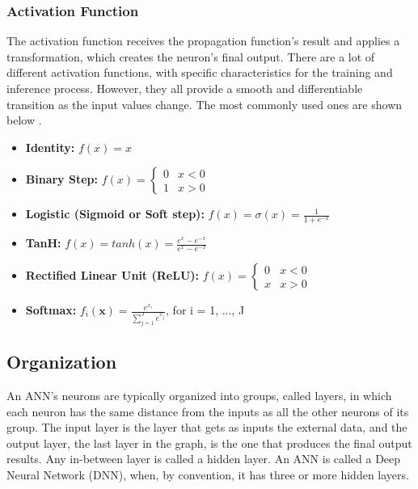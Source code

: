 \subsubsection{Activation Function}
The activation function receives the propagation function's result and applies a transformation, which creates the neuron's final output. There are a lot of different activation functions, with specific characteristics for the training and inference process. However, they all provide a smooth and differentiable transition as the input values change. The most commonly used ones are shown below \cite{Activation-Function-Wikipedia}.
\begin{itemize}
	\item \textbf{Identity:} $f(x) = x$

	\item \textbf{Binary Step:} $
		      f(x) =
		      \begin{cases}
			      0 & x < 0 \\
			      1 & x > 0
		      \end{cases}
	      $

	\item \textbf{Logistic (Sigmoid or Soft step):} $
		      f(x) = \sigma(x) = \frac{1}{1 + e^{-x}}
	      $

	\item \textbf{TanH:} $
		      f(x) = tanh(x) = \frac{e^{x} - e^{-x}}{e^{x} - e^{-x}}
	      $

	\item \textbf{Rectified Linear Unit (ReLU):} $
		      f(x) =
		      \begin{cases}
			      0 & x < 0 \\
			      x & x > 0
		      \end{cases}
	      $

	\item \textbf{Softmax:} $
		      f_i(\textbf{x}) = \frac{
		      e^{x_i}
		      }{
		      \sum_{j=1}^{J}e^{x_j}
			  }
		  $, for i = 1, ..., J
\end{itemize}

\subsection{Organization}
An ANN's neurons are typically organized into groups, called layers, in which each neuron has the same distance from the inputs as all the other neurons of its group. The input layer is the layer that gets as inputs the external data, and the output layer, the last layer in the graph, is the one that produces the final output results. Any in-between layer is called a hidden layer. An ANN is called a Deep Neural Network (DNN), when, by convention, it has three or more hidden layers.

